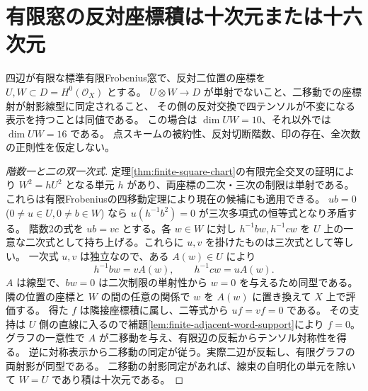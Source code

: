 \section{有限窓の反対座標積は十次元または十六次元}
\label{sec:finite-opposite-product-gap}
\begin{theorem}\label{thm:finite-opposite-product-gap}
四辺が有限な標準有限Frobenius窓で、反対二位置の座標を $U,W\subset D=H^0(\mathcal O_X)$ とする。
$U\otimes W\to D$ が単射でないこと、二移動での座標射が射影線型に同定されること、
その側の反対交換で四テンソルが不変になる表示を持つことは同値である。
この場合は $\dim UW=10$、それ以外では $\dim UW=16$ である。
点スキームの被約性、反対切断階数、印の存在、全次数の正則性を仮定しない。
\end{theorem}
\begin{proof}[階数一と二の双一次式]
定理\ref{thm:finite-square-chart}の有限完全交叉の証明により
$W^2=hU^2$ となる単元 $h$ があり、両座標の二次・三次の制限は単射である。
これらは有限Frobeniusの四移動定理により現在の候補にも適用できる。
$u b=0$ ($0\ne u\in U,0\ne b\in W$) なら $u(h^{-1}b^2)=0$ が三次多項式の恒等式となり矛盾する。
階数2の式を $u b=v c$ とする。各 $w\in W$ に対し $h^{-1}bw,h^{-1}cw$ を
$U$ 上の一意な二次式として持ち上げる。これらに $u,v$ を掛けたものは三次式として等しい。
一次式 $u,v$ は独立なので、ある $A(w)\in U$ により
\[
     h^{-1}bw=v A(w),\qquad h^{-1}cw=u A(w).
\]
$A$ は線型で、$bw=0$ は二次制限の単射性から $w=0$ を与えるため同型である。
隣の位置の座標と $W$ の間の任意の関係で $w$ を $A(w)$ に置き換えて $X$ 上で評価する。
得た $f$ は隣接座標積に属し、二等式から $uf=vf=0$ である。
その支持は $U$ 側の直線に入るので補題\ref{lem:finite-adjacent-word-support}により $f=0$。
グラフの一意性で $A$ が二移動を与え、有限辺の反転からテンソル対称性を得る。
逆に対称表示から二移動の同定が従う。実際二辺が反転し、有限グラフの両射影が同型である。
二移動の射影同定があれば、線束の自明化の単元を除いて $W=U$ であり積は十次元である。

\end{proof}
